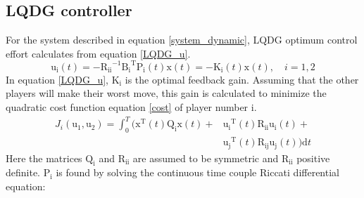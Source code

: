 \documentclass[conference]{IEEEtran}
\begin{document}
\subsection{LQDG controller}
For the system described in equation \eqref{system_dynamic}, LQDG optimum control effort calculates from equation \eqref{LQDG_u}.
\begin{equation}\label{LQDG_u}
	\boldsymbol{\mathrm{u_i}}(t) = -\boldsymbol{\mathrm{R_{ii}}}^{-1}\boldsymbol{\mathrm{B_i}}^\mathrm{T}\boldsymbol{\mathrm{P_{i}}}(t)\boldsymbol{\mathrm{x}}(t) = -\boldsymbol{\mathrm{K_{i}}}(t)\boldsymbol{\mathrm{x}}(t),\quad i = 1, 2
\end{equation}
In equation \eqref{LQDG_u}, $\boldsymbol{\mathrm{K_{i}}}$ is the optimal feedback gain. Assuming that the other players will make their worst move, this gain is calculated to minimize the quadratic cost function equation \eqref{cost} of player number i.
\begin{equation}\label{cost}
    \begin{split}
        J_i( \boldsymbol{\mathrm{u_1}},  \boldsymbol{\mathrm{u_2}}) = \int_{0}^{T}\biggl (\boldsymbol{\mathrm{x}} ^\mathrm{T}(t) \boldsymbol{\mathrm{Q_i}} \boldsymbol{\mathrm{x}}(t)+
        &\boldsymbol{\mathrm{u_i}} ^\mathrm{T}(t) \boldsymbol{\mathrm{R_{ii}}} \boldsymbol{\mathrm{u_i}}(t)+\\
        &\boldsymbol{\mathrm{u_j}} ^\mathrm{T}(t)\boldsymbol{\mathrm{ R_{ij} u_j}}(t)
        \biggl )\mathrm{d}t
    \end{split} 
\end{equation}
Here the matrices $\boldsymbol{\mathrm{Q_i}}$ and  $\boldsymbol{\mathrm{R_{ii}}}$ are assumed to be symmetric and $\boldsymbol{\mathrm{R_{ii}}}$ positive definite.
$\boldsymbol{\mathrm{P_{i}}}$ is found by solving the continuous time couple Riccati differential equation:
\end{document}
